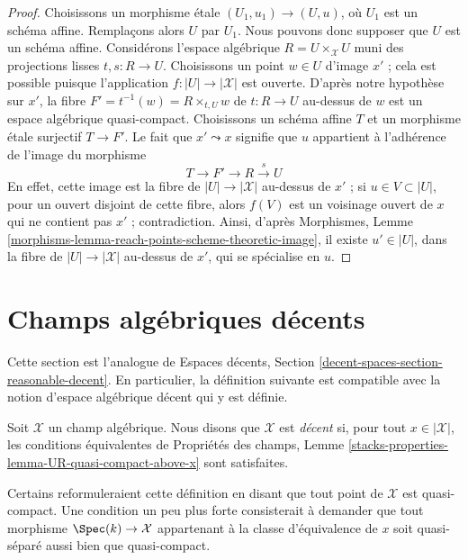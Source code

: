 \begin{proof}
Choisissons un morphisme \'etale $(U_1, u_1) \to (U, u)$, où $U_1$
est un schéma affine. Remplaçons alors $U$ par $U_1$.
Nous pouvons donc supposer que $U$ est un schéma affine.
Considérons l'espace algébrique $R = U \times_\mathcal{X} U$
muni des projections lisses $t, s : R \to U$.
Choisissons un point $w \in U$ d'image $x'$ ; cela est possible puisque
l'application $f : |U| \to |\mathcal{X}|$ est ouverte.
D'après notre hypothèse sur $x'$, la fibre
$F' = t^{-1}(w) = R \times_{t, U} w$
de $t : R \to U$ au-dessus de $w$ est un espace algébrique quasi-compact.
Choisissons un schéma affine $T$ et un morphisme \'etale surjectif
$T \to F'$. Le fait que $x' \leadsto x$ signifie que $u$ appartient à
l'adhérence de l'image du morphisme
$$
T \to F' \to R \xrightarrow{s} U
$$
En effet, cette image est la fibre de $|U| \to |\mathcal{X}|$
au-dessus de $x'$ ; si $u \in V \subset |U|$, pour un ouvert disjoint
de cette fibre, alors $f(V)$ est un voisinage ouvert de $x$
qui ne contient pas $x'$ ; contradiction.
Ainsi, d'après Morphismes, Lemme
\ref{morphisms-lemma-reach-points-scheme-theoretic-image},
il existe $u' \in |U|$, dans la fibre
de $|U| \to |\mathcal{X}|$ au-dessus de $x'$, qui se spécialise en $u$.
\end{proof}


\section{Champs algébriques décents}
\label{section-reasonable-decent}

\noindent
Cette section est l'analogue de
Espaces décents, Section \ref{decent-spaces-section-reasonable-decent}.
En particulier, la définition suivante est compatible avec
la notion d'espace algébrique décent qui y est définie.

\begin{definition}
\label{definition-decent}
Soit $\mathcal{X}$ un champ algébrique. Nous disons que $\mathcal{X}$ est
{\it décent} si, pour tout $x \in |\mathcal{X}|$, les conditions équivalentes
de Propriétés des champs, Lemme
\ref{stacks-properties-lemma-UR-quasi-compact-above-x} sont satisfaites.
\end{definition}

\noindent
Certains reformuleraient cette définition en disant que
tout point de $\mathcal{X}$ est quasi-compact.
Une condition un peu plus forte consisterait à demander que tout morphisme
$\Spec(k) \to \mathcal{X}$ appartenant à la classe d'équivalence de $x$ soit
quasi-séparé aussi bien que quasi-compact.

